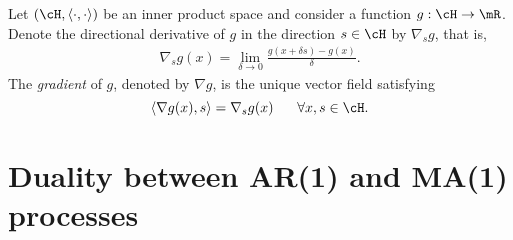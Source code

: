 \documentclass[preprint,12pt,authoryear]{elsarticle}
\begin{document}
Let $(\cH,\langle\cdot,\cdot\rangle)$ be an inner product space and consider a function $g:\cH\rightarrow\mR$.
Denote the directional derivative of $g$ in the direction $s\in\cH$ by $\nabla_s g$, that is,
\begin{eqnarray}\label{dirder}
\nabla_s g(x) = \lim_{\delta\rightarrow 0}\frac{g(x+\delta s)-g(x)}{\delta}.
\end{eqnarray}
The {\em gradient} of $g$, denoted by $\nabla g$, is the unique vector field satisfying
\[  \langle \nabla g(x),s\rangle = \nabla_s g(x) \hspace{6mm}\forall x,s\in\cH. \]






\section{Duality between AR(1) and MA(1) processes}\label{app-ar}
\end{document}

